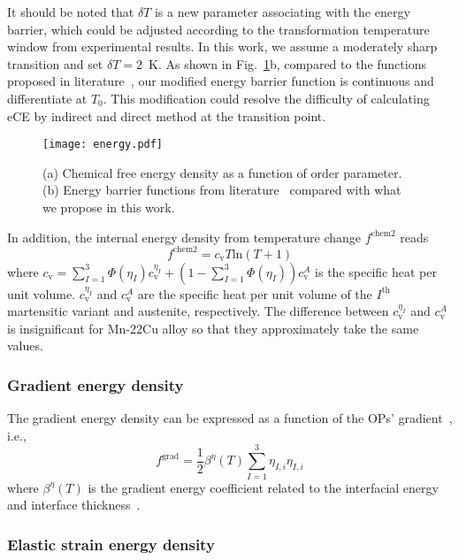 \documentclass[reprint,3p,sort&compress,times,onecolumn]{elsarticle}
\begin{document}
It should be noted that $\delta T$ is a new parameter associating with the energy barrier, which could be adjusted according to the transformation temperature window from experimental results. In this work, we assume a moderately sharp transition and set $\delta T = 2$~K.
As shown in Fig.~\ref{f-energy}b, compared to the functions proposed in literature~\cite{cisse2020elastocaloric,cui2017three,sun2019non}, our modified energy barrier function is continuous and differentiate at $T_0$. This modification could resolve the difficulty of calculating eCE by indirect and direct method at the transition point.

\begin{figure}[!t]
\centering
  \texttt{[image: energy.pdf]}
  \caption{(a) Chemical free energy density as a function of order parameter. (b) Energy barrier functions from literature~\cite{cui2017three,sun2019non,cisse2020elastocaloric} compared with what we propose in this work.} \label{f-energy}
\end{figure}

In addition, the internal energy density from temperature change $f^{\text{chem2}}$ reads
\begin{equation}
f^{\text{chem2}}= c_\text{v} T \text{ln}(T+1) \label{eq-f-th-classic}
\end{equation}
where $c_\text{v}=\sum_{I=1}^3 \Phi(\eta_I) c_\text{v}^{\eta_I}+(1-\sum_{I=1}^3\Phi(\eta_I))c_\text{v}^A$ is the specific heat per unit volume. $c_\text{v}^{\eta_I}$ and $c_\text{v}^A$ are the specific heat per unit volume of the $I^{\text{th}}$ martensitic variant and austenite, respectively. The difference between $c_\text{v}^{\eta_I}$ and $c_\text{v}^A$ is insignificant for Mn-22Cu alloy so that they approximately take the same values.

\subsubsection{Gradient energy density}
The gradient energy density can be expressed as a function of the OPs' gradient~\cite{artemev2001three}, i.e.,
\begin{equation}
f^\text{grad} = \frac{1}{2} \beta^{\eta}(T) \sum_{I=1}^3 \eta_{I,i}\eta_{I,i} \label{eq6}
\end{equation}
where $\beta^{\eta}(T)$ is the gradient energy coefficient related to the interfacial energy and interface thickness~\cite{yeddu2012three-dimensional}. 

\subsubsection{Elastic strain energy  density}
\end{document}
